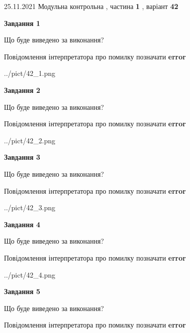 \documentclass[10pt, ukrainian]{article}
\begin{document}
{25.11.2021 Модульна контрольна , частина \textbf { 1 }, варіант  \No \textbf { 42 }\par}
{
\begin {large}

{\begin {center}\textbf{Завдання 1}\end {center}}\par
Що буде виведено за виконання? \par
Повідомлення інтерпретатора про помилку позначати \textbf{error}

\begin{center}
	{../pict/42_1.png}
\end{center}
\newpage

{\begin {center}\textbf{Завдання 2}\end {center}}\par
Що буде виведено за виконання? \par
Повідомлення інтерпретатора про помилку позначати \textbf{error}

\begin{center}
	{../pict/42_2.png}
\end{center}
\newpage

{\begin {center}\textbf{Завдання 3}\end {center}}\par
Що буде виведено за виконання? \par
Повідомлення інтерпретатора про помилку позначати \textbf{error}

\begin{center}
	{../pict/42_3.png}
\end{center}
\newpage

{\begin {center}\textbf{Завдання 4}\end {center}}\par
Що буде виведено за виконання? \par
Повідомлення інтерпретатора про помилку позначати \textbf{error}

\begin{center}
	{../pict/42_4.png}
\end{center}
\newpage

{\begin {center}\textbf{Завдання 5}\end {center}}\par
Що буде виведено за виконання? \par
Повідомлення інтерпретатора про помилку позначати \textbf{error}


\end{large}}
\end{document}
